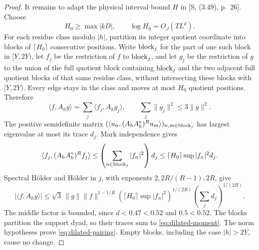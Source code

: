 \documentclass[11pt]{article}
\theoremstyle{definition}
\theoremstyle{remark}
\begin{document}
\begin{proof}
It remains to adapt the physical interval bound $H$ in [S, (3.49),
p.~26]. Choose
\begin{equation}\label{eq:quotient-radius}
H_0\ge\max|kD|,\qquad \log H_0=O_J(TL^d).
\end{equation}
For each residue class modulo $|h|$, partition its integer quotient
coordinate into blocks of $\lceil H_0\rceil$ consecutive positions.
Write ${\rm block}_j$ for the part of one such block in $[Y,2Y)$, let
$f_j$ be the restriction of $f$ to ${\rm block}_j$, and let $g_j$ be
the restriction of $g$ to the union of the full quotient block containing
${\rm block}_j$ and the two adjacent full quotient blocks of that same
residue class, without intersecting these blocks with $[Y,2Y)$. Every edge stays in the
class and moves at most $H_0$ quotient positions. Therefore
\begin{equation}\label{eq:quotient-blocks}
\langle f,A_hg\rangle=\sum_j\langle f_j,A_hg_j\rangle,
\qquad \sum_j\|g_j\|^2\le3\|g\|^2.
\end{equation}
The positive semidefinite matrix
$(\langle u_n,(A_hA_h^*)^Ru_m\rangle)_{n,m\in{\rm block}_j}$
has largest eigenvalue at most its trace $d_j$. Mark independence gives
\begin{equation}\label{eq:block-trace}
\langle f_j,(A_hA_h^*)^Rf_j\rangle
\le\left(\sum_{n\in{\rm block}_j}|f_n|^2\right)d_j
\le\lceil H_0\rceil\sup|f_n|^2d_j.
\end{equation}
Spectral H\"older and H\"older in $j$, with exponents
$2,2R/(R-1),2R$, give
\begin{equation}\label{eq:block-holder}
|\langle f,A_hg\rangle|
\le\sqrt3\,\|g\|\|f\|^{1-1/R}
(\lceil H_0\rceil\sup|f_n|^2)^{1/(2R)}
\left(\sum_jd_j\right)^{1/(2R)}.
\end{equation}
The middle factor is bounded, since $d<0.47<0.52$ and $0.5<0.52$.
The blocks partition the support dyad, so their traces sum to
\eqref{eq:dilated-moment}. The norm hypotheses prove
\eqref{eq:dilated-pairing}. Empty blocks, including the case
$|h|>2Y$, cause no change.
\end{proof}
\end{document}
